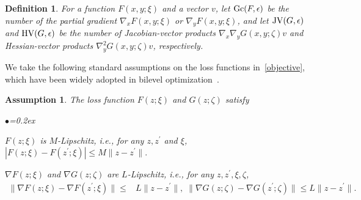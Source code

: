 \documentclass{osudissert96}
\newtheorem{assum}{Assumption}
\newtheorem{definition}{Definition}
\begin{document}
\begin{definition}\label{stoc_com_measure}
For a function $F(x,y;\xi)$  and a vector $v$, let $\mbox{\normalfont Gc}(F,\epsilon)$ be the number of the partial gradient $\nabla_x F(x,y;\xi)$ or $\nabla_y F(x,y;\xi)$, and let $\mbox{\normalfont JV}(G,\epsilon)$ and  $\mbox{\normalfont HV}(G,\epsilon)$ be the number of Jacobian-vector products $\nabla_x\nabla_y G (x,y;\zeta)v$ 
  and  Hessian-vector products $\nabla_y^2G(x,y;\zeta) v$, respectively.  %
 \end{definition} 
We  take the following standard assumptions on the loss functions in~\cref{objective}, which have been widely adopted in bilevel optimization~\cite{ghadimi2018approximation,ji2020convergence}.
\begin{assum}\label{ass:lip_stoc}
The loss function $F(z;\xi)$ and $G(z;\zeta)$ satisfy
\begin{list}{$\bullet$}{\topsep=0.2ex \leftmargin=0.2in  \itemsep =0.01in}
\item $F(z;\xi)$ is $M$-Lipschitz, i.e.,  for any $z,z^\prime$ and $\xi$, $|F(z;\xi)-F(z^\prime;\xi)|\leq M\|z-z^\prime\|.$
\item $\nabla F(z;\xi)$ and $\nabla G(z;\zeta)$ are $L$-Lipschitz, i.e., for any $z,z^\prime,\xi,\zeta$, 
\vspace{-0.1cm}
\begin{align*}
\|\nabla F(z;\xi)-\nabla F(z^\prime;\xi)\|\leq& L\|z-z^\prime\|,\;\|\nabla G(z;\zeta)-\nabla G(z^\prime;\zeta)\|\leq L\|z-z^\prime\|.
\end{align*}
\end{list}
\vspace{-0.4cm}
\end{assum}
\end{document}
